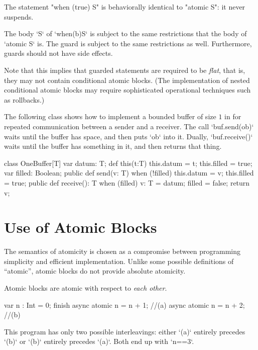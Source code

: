 The statement \xcd"when (true) S" is
behaviorally identical to \xcd"atomic S": it never suspends.

The body \xcd`S` of \xcd`when(b)S` is subject to the same restrictions that
the body of \xcd`atomic S` is.  The guard is subject to the same restrictions
as well.  Furthermore, guards should not have side effects.


Note that this implies that guarded statements are required to be {\em
flat}, that is, they may not contain conditional atomic blocks. (The
implementation of nested conditional atomic blocks may require
sophisticated operational techniques such as rollbacks.)


\begin{ex}
The following class shows how to implement a bounded buffer of size
$1$ in \Xten{} for repeated communication between a sender and a
receiver.  The call \xcd`buf.send(ob)` waits until the buffer has space, and
then puts \xcd`ob` into it.  Dually, \xcd`buf.receive()` waits until the
buffer has something in it, and then returns that thing.


\begin{xten}
class OneBuffer[T] {
  var datum: T;
  def this(t:T) { this.datum = t; this.filled = true; }
  var filled: Boolean;
  public def send(v: T) {
    when (!filled) {
      this.datum = v;
      this.filled = true;
    }
  }
  public def receive(): T {
    when (filled) {
      v: T = datum;
      filled = false;
      return v;
    }
  }
}
\end{xten}
%
\end{ex}

\section{Use of Atomic Blocks}

The semantics of atomicity is chosen as a compromise between programming
simplicity and efficient implementation.  Unlike some possible definitions of
``atomic'', atomic blocks do not provide absolute atomicity.  

Atomic blocks are atomic with respect to {\em each other}.
\begin{xten}
var n : Int = 0;
finish {
  async atomic n = n + 1; //(a)
  async atomic n = n + 2; //(b)
}
\end{xten}
This program has only two possible interleavings: either \xcd`(a)` entirely
precedes \xcd`(b)` or \xcd`(b)` entirely precedes \xcd`(a)`.  Both end up with
\xcd`n==3`. 


